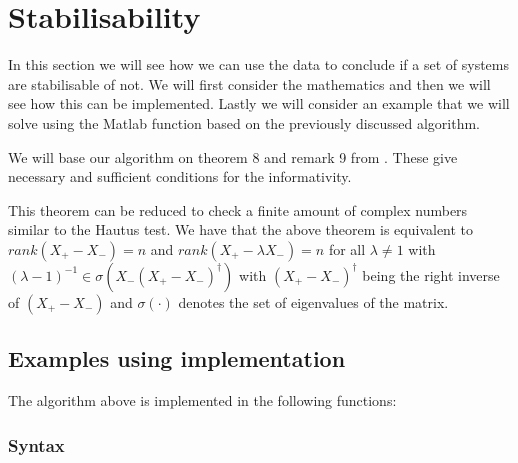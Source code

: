 \section{Stabilisability}
In this section we will see how we can use the data to conclude if a set of systems are stabilisable of not. We will first consider the mathematics and then we will see how this can be implemented. Lastly we will consider an example that we will solve using the Matlab function based on the previously discussed algorithm.


We will base our algorithm on theorem 8 and remark 9 from \cite{waarde2019data}. These give necessary and sufficient conditions for the informativity.


This theorem can be reduced to check a finite amount of complex numbers similar to the Hautus test. We have that the above theorem is equivalent to $rank(X_+ - X_-) = n$ and $rank(X_+ - \lambda X_-) = n$ for all $\lambda \neq 1$ with $(\lambda - 1)^{-1} \in \sigma(X_- (X_+ - X_-)^\dagger)$ with $(X_+ - X_-)^\dagger$ being the right inverse of $(X_+ - X_-)$ and $\sigma(\cdot)$ denotes the set of eigenvalues of the matrix.




\subsection{Examples using implementation}
The algorithm above is implemented in the following functions:
\subsubsection*{Syntax}
 \\


